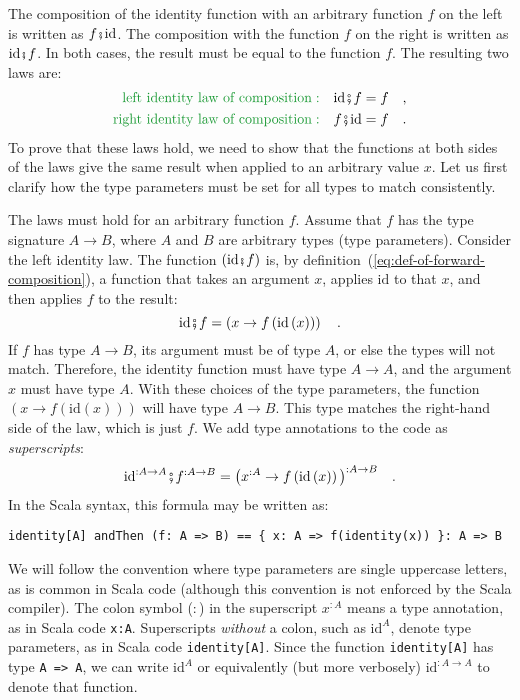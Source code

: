 The composition of the identity function with an arbitrary function
$f$ on the left is written as $f\bef\text{id}$. The composition
with the function $f$ on the right is written as $\text{id}\bef f$.
In both cases, the result must be equal to the function $f$. The
resulting two laws are:
\begin{align*}
{\color{greenunder}\text{left identity law of composition}:}\quad & \text{id}\bef f=f\quad,\\
{\color{greenunder}\text{right identity law of composition}:}\quad & f\bef\text{id}=f\quad.
\end{align*}
To prove that these laws hold, we need to show that the functions
at both sides of the laws  give the same result when applied to an
arbitrary value $x$. Let us first clarify how the type parameters
must be set for all types to match consistently.

The laws must hold for an arbitrary function $f$. Assume that $f$
has the type signature $A\rightarrow B$, where $A$ and $B$ are
arbitrary types (type parameters). Consider the left identity law.
The function $(\text{id}\bef f)$ is, by definition~(\ref{eq:def-of-forward-composition}),
a function that takes an argument $x$, applies $\text{id}$ to that
$x$, and then applies $f$ to the result: 
\[
\text{id}\bef f=\left(x\rightarrow f\left(\text{id}\,(x)\right)\right)\quad.
\]
If $f$ has type $A\rightarrow B$, its argument must be of type $A$,
or else the types will not match. Therefore, the identity function
must have type $A\rightarrow A$, and the argument $x$ must have
type $A$. With these choices of the type parameters, the function
$\left(x\rightarrow f(\text{id}(x))\right)$ will have type $A\rightarrow B$.
This type matches the right-hand side of the law, which is just $f$.
We add type annotations to the code as \emph{superscripts}:
\[
\text{id}^{:A\rightarrow A}\bef f^{:A\rightarrow B}=\big(x^{:A}\rightarrow f\left(\text{id}\,(x)\right)\big)^{:A\rightarrow B}\quad.
\]
In the Scala syntax, this formula may be written as:
\begin{lstlisting}
identity[A] andThen (f: A => B) == { x: A => f(identity(x)) }: A => B
\end{lstlisting}

We will follow the convention where type parameters are single uppercase
letters, as is common in Scala code (although this convention is not
enforced by the Scala compiler). The colon symbol ($:$) in the superscript
$x^{:A}$ means a type annotation, as in Scala code \lstinline!x:A!.
Superscripts \emph{without} a colon, such as $\text{id}^{A}$, denote
type parameters, as in Scala code \lstinline!identity[A]!. Since
the function \lstinline!identity[A]! has type \lstinline!A => A!,
we can write $\text{id}^{A}$ or equivalently (but more verbosely)
$\text{id}^{:A\rightarrow A}$ to denote that function.

